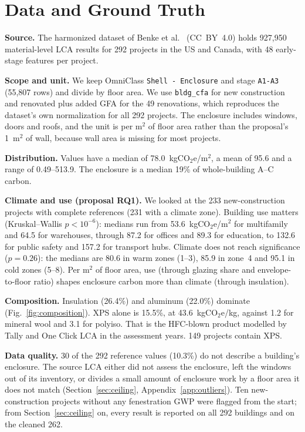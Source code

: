 \documentclass[10pt,letterpaper]{article}
\newcommand{\coe}{kgCO$_2$e/m$^2$}
\begin{document}
\section{Data and Ground Truth}
\label{sec:data}
\textbf{Source.} The harmonized dataset of Benke et al.~\cite{benke2025} (CC~BY~4.0) holds 927,950 material-level LCA results for 292 projects in the US and Canada, with 48 early-stage features per project.

\textbf{Scope and unit.} We keep OmniClass \texttt{Shell - Enclosure} and stage \texttt{A1-A3} (55,807 rows) and divide by floor area. We use \texttt{bldg\_cfa} for new construction and renovated plus added GFA for the 49 renovations, which reproduces the dataset's own normalization for all 292 projects. The enclosure includes windows, doors and roofs, and the unit is per m$^2$ of floor area rather than the proposal's 1~m$^2$ of wall, because wall area is missing for most projects.

\textbf{Distribution.} Values have a median of 78.0~\coe{}, a mean of 95.6 and a range of 0.49--513.9. The enclosure is a median 19\% of whole-building A--C carbon.

\textbf{Climate and use (proposal RQ1).} We looked at the 233 new-construction projects with complete references (231 with a climate zone). Building use matters (Kruskal--Wallis $p<10^{-6}$): medians run from 53.6~\coe{} for multifamily and 64.5 for warehouses, through 87.2 for offices and 89.3 for education, to 132.6 for public safety and 157.2 for transport hubs. Climate does not reach significance ($p=0.26$): the medians are 80.6 in warm zones (1--3), 85.9 in zone~4 and 95.1 in cold zones (5--8). Per m$^2$ of floor area, use (through glazing share and envelope-to-floor ratio) shapes enclosure carbon more than climate (through insulation).

\textbf{Composition.} Insulation (26.4\%) and aluminum (22.0\%) dominate (Fig.~\ref{fig:composition}). XPS alone is 15.5\%, at 43.6~kgCO$_2$e/kg, against 1.2 for mineral wool and 3.1 for polyiso. That is the HFC-blown product modelled by Tally and One Click LCA in the assessment years. 149 projects contain XPS.

\textbf{Data quality.} 30 of the 292 reference values (10.3\%) do not describe a building's enclosure. The source LCA either did not assess the enclosure, left the windows out of its inventory, or divides a small amount of enclosure work by a floor area it does not match (Section~\ref{sec:ceiling}, Appendix~\ref{app:outliers}). Ten new-construction projects without any fenestration GWP were flagged from the start; from Section~\ref{sec:ceiling} on, every result is reported on all 292 buildings and on the cleaned 262.
\end{document}
